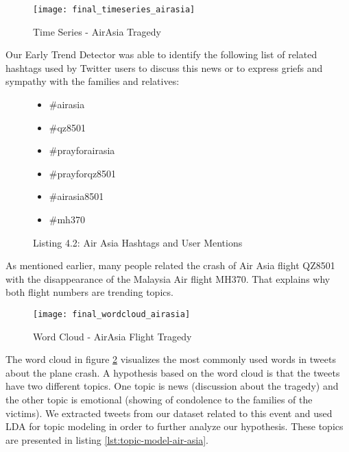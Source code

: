\begin{figure}[H]
  \centering
        \texttt{[image: final\_timeseries\_airasia]}
  \caption[Time Series - AirAsia Tragedy]{Time Series - AirAsia Tragedy}
  \label{fig:air-asia-time-series}
  \vspace{-1.3em}
\end{figure}

Our Early Trend Detector was able to identify the following list of related hashtags used by Twitter users to discuss this news or to express griefs and sympathy with the families and relatives:

\begin{figure}[H]
\begin{multicols}{2}
\begin{itemize}[label={}]
	\item \#airasia
	\item \#qz8501
    \item \#prayforairasia
    \item \#prayforqz8501
    \item \#airasia8501
    \item \#mh370
\end{itemize}
\end{multicols}
\caption*{Listing 4.2: Air Asia Hashtags and User Mentions}
\end{figure}

As mentioned earlier, many people related the crash of Air Asia flight QZ8501 with the disappearance of the Malaysia Air flight MH370. That explains why both flight numbers are trending topics.

\begin{figure}[H]
  \centering
        \texttt{[image: final\_wordcloud\_airasia]}
  \caption[Word Cloud - AirAsia Tragedy]{Word Cloud - AirAsia Flight Tragedy}
  \label{fig:air-asia-flight-tragedy-word-cloud}
  \vspace{-1.3em}
\end{figure}

The word cloud in figure \ref{fig:air-asia-flight-tragedy-word-cloud} visualizes the most commonly used words in tweets about the plane crash. A hypothesis based on the word cloud is that the tweets have two different topics. One topic is news (discussion about the tragedy) and the other topic is emotional (showing of condolence to the families of the victims).
We extracted tweets from our dataset related to this event and used LDA for topic modeling in order to further analyze our hypothesis. These topics are presented in listing \ref{lst:topic-model-air-asia}.

